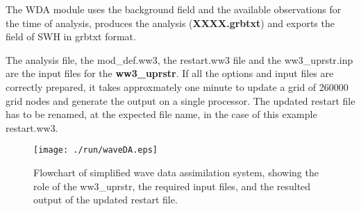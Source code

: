 The WDA module uses the background field and the available observations
for the time of analysis, produces the analysis (\textbf{XXXX.grbtxt}) and exports 
the field of SWH in grbtxt format.

The analysis file, the mod\_def.ww3, the restart.ww3 file and the ww3\_uprstr.inp 
are the input files for the \textbf{ww3\_uprstr}. If all the options and input 
files are correctly prepared, it takes approxmately one minute to update a grid 
of 260000 grid nodes and generate the output on a single processor. 
The updated restart file has to be renamed, at the expected file name, in the case of this
example restart.ww3. \newline  


\begin{figure} \begin{center}
\texttt{[image: ./run/waveDA.eps]}
\caption{Flowchart of simplified wave data assimilation system, 
showing the role of the {ww3\_uprstr}, the required input files,
and the resulted output of the updated restart file.}
\label{fig:waveDAflowchart} \botline
\end{center}
\end{figure}


\pb
